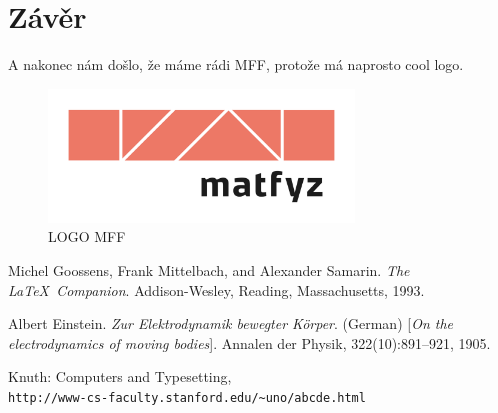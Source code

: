 \documentclass[a4paper]{article}
\begin{document}
\section*{Závěr}
\par A nakonec nám došlo, že máme rádi MFF, protože má naprosto cool logo.
\begin{figure}[!ht]
\centering
\caption{LOGO MFF}
\includegraphics[width=230pt]{matfyz_barevne.png}
\end{figure}

\renewcommand\refname{Použitá literatura}
\begin{thebibliography}{}
Michel Goossens, Frank Mittelbach, and Alexander Samarin. 
\textit{The \LaTeX\ Companion}. 
Addison-Wesley, Reading, Massachusetts, 1993.
 
Albert Einstein. 
\textit{Zur Elektrodynamik bewegter K{\"o}rper}. (German) 
[\textit{On the electrodynamics of moving bodies}]. 
Annalen der Physik, 322(10):891–921, 1905.
 
Knuth: Computers and Typesetting,
\\\texttt{http://www-cs-faculty.stanford.edu/\~{}uno/abcde.html}
\end{thebibliography}
\end{document}
